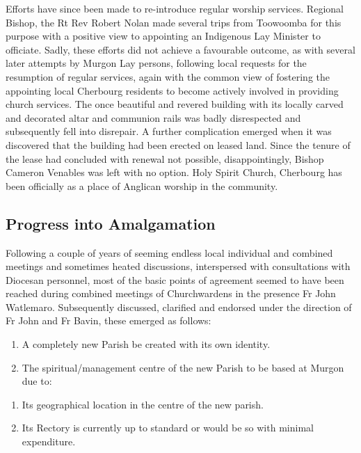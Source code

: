 Efforts have since been made to re-introduce regular worship services. Regional Bishop, the Rt Rev Robert Nolan made several trips from Toowoomba for this purpose with a positive view to appointing an Indigenous Lay Minister to officiate. Sadly, these efforts did not achieve a favourable outcome, as with several later attempts by Murgon Lay persons, following local requests for the resumption of regular services, again with the common view of fostering the appointing local Cherbourg residents to become actively involved in providing church services. The once beautiful and revered building with its locally carved and decorated altar and communion rails was badly disrespected and subsequently fell into disrepair. A further complication emerged when it was discovered that the building had been erected on leased land. Since the tenure of the lease had concluded with renewal not possible, disappointingly, Bishop Cameron Venables was left with no option. Holy Spirit Church, Cherbourg has been officially as a place of Anglican worship in the community.

\hypertarget{progress-into-amalgamation}{%
\subsection{Progress into Amalgamation}\label{progress-into-amalgamation}}

Following a couple of years of seeming endless local individual and combined meetings and sometimes heated discussions, interspersed with consultations with Diocesan personnel, most of the basic points of agreement seemed to have been reached during combined meetings of Churchwardens in the presence Fr John Watlemaro. Subsequently discussed, clarified and endorsed under the direction of Fr John and Fr Bavin, these emerged as follows:

\begin{enumerate}
\def\labelenumi{\arabic{enumi}.}
\item
  A completely new Parish be created with its own identity.
\item
  The spiritual/management centre of the new Parish to be based at Murgon due to:
\end{enumerate}

\begin{enumerate}
\def\labelenumi{(\alph{enumi})}
\item
  Its geographical location in the centre of the new parish.
\item
  Its Rectory is currently up to standard or would be so with minimal expenditure.
\end{enumerate}

